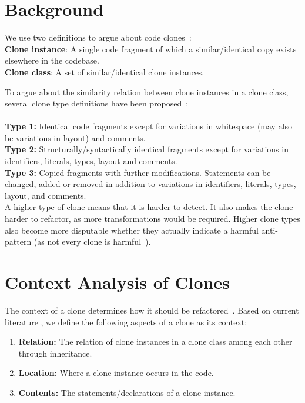 \documentclass[runningheads]{llncs}
\begin{document}
\section{Background}
We use two definitions to argue about code clones~\cite{roy2007survey}:
\\ \textbf{Clone instance}: A single code fragment of which a similar/identical copy exists elsewhere in the codebase.
\\ \textbf{Clone class}: A set of similar/identical clone instances.

To argue about the similarity relation between clone instances in a clone class, several clone type definitions have been proposed~\cite{roy2007survey}:
\\\\
\textbf{Type 1:} Identical code fragments except for variations in whitespace (may also be variations in layout) and comments.\\
\textbf{Type 2:} Structurally/syntactically identical fragments except for variations in identifiers, literals, types, layout and comments.\\
\textbf{Type 3:} Copied fragments with further modifications. Statements can be changed, added or removed in addition to variations in identifiers, literals, types, layout, and comments.\\

A higher type of clone means that it is harder to detect. It also makes the clone harder to refactor, as more transformations would be required. Higher clone types also become more disputable whether they actually indicate a harmful anti-pattern (as not every clone is harmful~\cite{jarzabek2010clones, kapser2008cloning}).

\section{Context Analysis of Clones}\label{chap:contextsetup}
The context of a clone determines how it should be refactored~\cite{fowler2018refactoring}. Based on current literature \cite{fontana2012duplicated, fontana2015duplicated}, we define the following aspects of a clone as its context:
\begin{enumerate}
  \item \textbf{Relation:} The relation of clone instances in a clone class among each other through inheritance.
  \item \textbf{Location:} Where a clone instance occurs in the code.
  \item \textbf{Contents:} The statements/declarations of a clone instance.
\end{enumerate}
\end{document}
